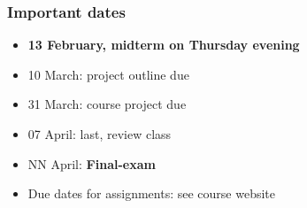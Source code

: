 \begin{frame}\frametitle{Important dates}
	\begin{itemize}
		\item	{\color{myRed} \textbf{13 February, midterm on Thursday evening}} \\{\color{myOrange}{Notify me of clashes this week!}}
		\item	10 March: project outline due
		\item	31 March: course project due
		\item	07 April: last, review class
		\item	NN April: \textbf{Final-exam}
	\end{itemize}
	\begin{itemize}
		\item	Due dates for assignments: see course website
	\end{itemize}
\end{frame}
